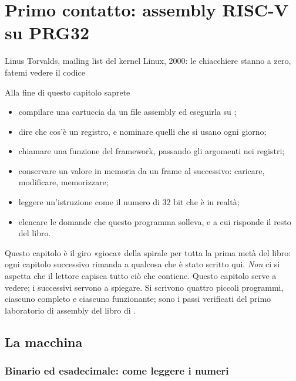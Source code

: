 \chapter{Primo contatto: assembly RISC-V su PRG32}
\label{ch:firstcontact}

  {Linus Torvalds, mailing list del kernel Linux, 2000: le chiacchiere stanno a zero, fatemi vedere il codice}

\begin{chapgoals}
Alla fine di questo capitolo saprete
\begin{itemize}
\item compilare una cartuccia da un file assembly ed eseguirla su \prg;
\item dire che cos'è un registro, e nominare quelli che si usano ogni giorno;
\item chiamare una funzione del framework, passando gli argomenti nei registri;
\item conservare un valore in memoria da un frame al successivo: caricare, modificare, memorizzare;
\item leggere un'istruzione come il numero di 32 bit che è in realtà;
\item elencare le domande che questo programma solleva, e a cui risponde il resto del libro.
\end{itemize}
\end{chapgoals}


Questo capitolo è il giro «gioca» della spirale per tutta la prima metà del
libro: ogni capitolo successivo rimanda a qualcosa che è stato scritto qui.
\emph{Non} ci si aspetta che il lettore capisca tutto ciò che contiene. Questo
capitolo serve a vedere; i successivi servono a spiegare. Si scrivono quattro
piccoli programmi, ciascuno completo e ciascuno funzionante; sono i passi
verificati del primo laboratorio di assembly del libro di \prg
\citep{prg32textbook}.

\section{La macchina}

\subsection{Binario ed esadecimale: come leggere i numeri}

